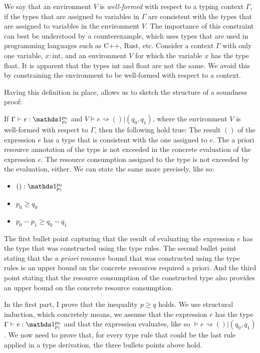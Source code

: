 We say that an environment \(V\) is \emph{well-formed} with respect to a typing context \(\Gamma\), if the types that are assigned to variables in \(\Gamma\) are consistent with the types that are assigned to variables in the environment \(V\). The importance of this constraint can best be understood by a counterexample, which uses types that are used in programming languages such as C++, Rust, etc. Consider a context \(\Gamma\) with only one variable, \( x : \text{int}\), and an environment \(V\) for which the variable \(x\) has the type float. It is apparent that the types int and float are not the same. We avoid this by constraining the environment to be well-formed with respect to a context.

Having this definition in place, allows us to sketch the structure of a soundness proof:

If \(\Gamma \vdash e : \unit^{p_0}_{p_1}\) and \(V \vDash e \rightsquigarrow  () | (q_0, q_1) \), where the environment \(V\) is well-formed with respect to \(\Gamma\), then the following hold true:
The result \(()\) of the expression \(e\) has a type that is consistent with the one assigned to \(e\). The a priori resource annotation of the type is not exceeded in the concrete evaluation of the expression \(e\). The resource consumption assigned to the type is not exceeded by the evaluation, either. We can state the same more precisely, like so: 

\begin{itemize}
   \item \(() : \unit^{p_0}_{p_1}\) 
   \item \(p_0 \geq q_0\)     
   \item \(p_0 - p_1 \geq q_0 - q_1\)
\end{itemize}

The first bullet point capturing that the result of evaluating the expression \(e\) has the type that was constructed using the type rules. The second bullet point stating that the \emph{a priori} resource bound that was constructed using the type rules is an upper bound on the concrete resources required a priori. And the third point stating that the resource consumption of the constructed type also provides an upper bound on the concrete resource consumption.

In the first part, I prove that the inequality \(p \geq q\) holds. We use structural induction, which concretely means, we assume that the expression \(e\) has the type \(\Gamma \vdash e : \unit^{p_0}_{p_1}\) and that the expression evaluates, like so \(\vDash e \rightsquigarrow () | (q_0, q_1)\). We now need to prove that, for every type rule that could be the last rule applied in a type derivation, the three bullets points above hold. 

